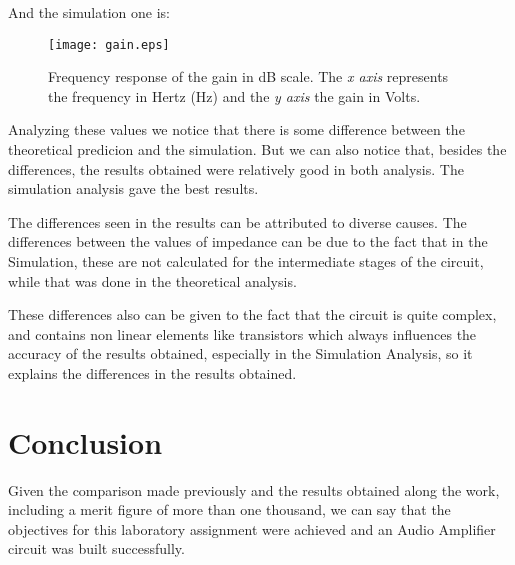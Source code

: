 And the simulation one is:

\begin{figure}[H] \centering
	\texttt{[image: gain.eps]}
	\caption {Frequency response of the gain in dB scale. The \textit{x axis} represents the frequency in Hertz (Hz) and the \textit{y axis} the gain in Volts.}
	\label{fig:teo_gaindB}
\end{figure}

Analyzing these values we notice that there is some difference between the theoretical predicion and the simulation. But we can also notice that, besides the differences, the results obtained were relatively good in both analysis. The simulation analysis gave the best results.

The differences seen in the results can be attributed to diverse causes. The differences between the values of impedance can be due to the fact that in the Simulation, these are not calculated for the intermediate stages of the circuit, while that was done in the theoretical analysis.\par
These differences also can be given to the fact that the circuit is quite complex, and contains non linear elements like transistors which always influences the accuracy of the results obtained, especially in the Simulation Analysis, so it explains the differences in the results obtained.\par


\newpage
\section{Conclusion}
\label{sec:conclusion}

Given the comparison made previously and the results obtained along the work, including a merit figure of more than one thousand, we can say that the objectives for this laboratory assignment were achieved and an Audio Amplifier circuit was built successfully. 





